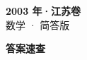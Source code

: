 \documentclass[zihao=-4, a4paper]{ctexart}
\begin{document}
\begin{center}
  {\Large\bfseries 2003 年·江苏卷}\\[4pt]
  {\large 数学 · 简答版}
\end{center}
\medskip
{}

\clearpage
{}
\begin{center}{\Large\bfseries 答案速查}\end{center}
\medskip

\end{document}
